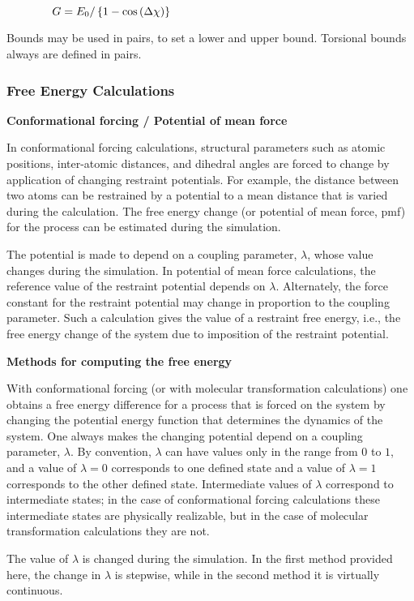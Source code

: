 $\qquad \qquad G=E_{0}/\left\{ 1-\cos \left( \Delta \chi \right) \right\}
\bigskip $

Bounds may be used in pairs, to set a lower and upper bound. Torsional
bounds always are defined in pairs.\pagebreak

\subsubsection{Free Energy Calculations}

{\bf Conformational forcing / Potential of mean force}

In conformational forcing calculations, structural parameters such as atomic
positions, inter-atomic distances, and dihedral angles are forced to change
by application of changing restraint potentials. For example, the distance
between two atoms can be restrained by a potential to a mean distance that
is varied during the calculation. The free energy change (or potential of
mean force, pmf) for the process can be estimated during the simulation.

The potential is made to depend on a coupling parameter, $\lambda $, whose
value changes during the simulation. In potential of mean force
calculations, the reference value of the restraint potential depends on $%
\lambda $. Alternately, the force constant for the restraint potential may
change in proportion to the coupling parameter. Such a calculation gives the
value of a restraint free energy, i.e., the free energy change of the
syste\bigskip m due to imposition of the restraint potential.

{\bf Methods for computing the free energy}

With conformational forcing (or with molecular transformation calculations)
one obtains a free energy difference for a process that is forced on the
system by changing the potential energy function that determines the
dynamics of the system. One always makes the changing potential depend on a
coupling parameter, $\lambda $. By convention, $\lambda $ can have values
only in the range from $0$ to $1$, and a value of $\lambda =0$ corresponds
to one defined state and a value of $\lambda =1$ corresponds to the other
defined state. Intermediate values of $\lambda $ correspond to intermediate
states; in the case of conformational forcing calculations these
intermediate states are physically realizable, but in the case of molecular
transformation calculations they are not.

The value of $\lambda $ is changed during the simulation. In the first
method provided here, the change in $\lambda $ is stepwise, while in the
second method it is virtually continuous.\medskip

